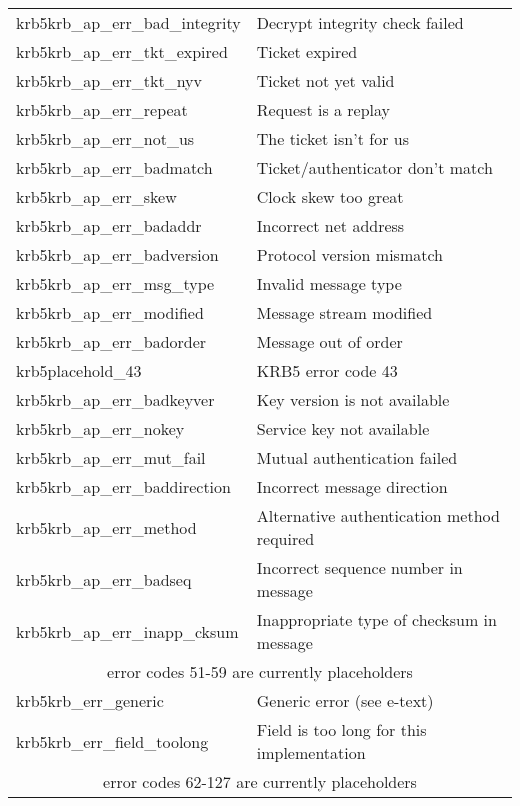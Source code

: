 \begin{small}
\begin{tabular}{ll}
{\sc krb5krb_ap_err_bad_integrity }&  Decrypt integrity check failed \\
{\sc krb5krb_ap_err_tkt_expired }& Ticket expired \\
{\sc krb5krb_ap_err_tkt_nyv }& Ticket not yet valid \\
{\sc krb5krb_ap_err_repeat }& Request is a replay \\
{\sc krb5krb_ap_err_not_us }& The ticket isn't for us \\
{\sc krb5krb_ap_err_badmatch }& Ticket/authenticator don't match \\
{\sc krb5krb_ap_err_skew }& Clock skew too great \\
{\sc krb5krb_ap_err_badaddr }& Incorrect net address \\
{\sc krb5krb_ap_err_badversion }& Protocol version mismatch \\
{\sc krb5krb_ap_err_msg_type }& Invalid message type \\
{\sc krb5krb_ap_err_modified }& Message stream modified \\
{\sc krb5krb_ap_err_badorder }& Message out of order \\
{\sc krb5placehold_43 }&	 KRB5 error code 43 \\
{\sc krb5krb_ap_err_badkeyver }& Key version is not available \\
{\sc krb5krb_ap_err_nokey }& Service key not available \\
{\sc krb5krb_ap_err_mut_fail }& Mutual authentication failed \\
{\sc krb5krb_ap_err_baddirection }& Incorrect message direction \\
{\sc krb5krb_ap_err_method }& Alternative authentication method required \\
{\sc krb5krb_ap_err_badseq }& Incorrect sequence number in message \\
{\sc krb5krb_ap_err_inapp_cksum }& Inappropriate type of checksum in message \\ 
\multicolumn{2}{c}{error codes 51-59 are currently placeholders} \\

{\sc krb5krb_err_generic }& Generic error (see e-text) \\
{\sc krb5krb_err_field_toolong }& Field is too long for this implementation \\
\multicolumn{2}{c}{error codes 62-127 are currently placeholders} \\
\end{tabular}


\end{small}
